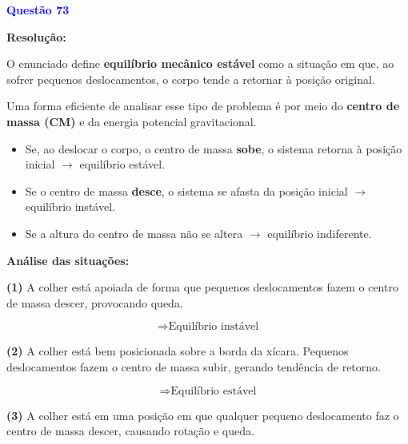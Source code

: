\documentclass[a4paper,12pt]{article}
\begin{document}
\begin{flushleft}

\textbf{\textcolor{blue}{\Large Quest\~ao 73}}\\

\vspace{0.3cm}

\textbf{Resolu\c{c}\~ao:}

\vspace{0.3cm}

O enunciado define \textbf{equilíbrio mecânico estável} como a situação em que, ao sofrer pequenos deslocamentos, o corpo tende a retornar à posição original.

\vspace{0.3cm}

Uma forma eficiente de analisar esse tipo de problema é por meio do \textbf{centro de massa (CM)} e da energia potencial gravitacional.

\begin{itemize}
\item Se, ao deslocar o corpo, o centro de massa \textbf{sobe}, o sistema retorna à posição inicial $\rightarrow$ equilíbrio estável.
\item Se o centro de massa \textbf{desce}, o sistema se afasta da posição inicial $\rightarrow$ equilíbrio instável.
\item Se a altura do centro de massa não se altera $\rightarrow$ equilíbrio indiferente.
\end{itemize}

\vspace{0.3cm}

\textbf{Análise das situações:}

\vspace{0.2cm}

\textbf{(1)} A colher está apoiada de forma que pequenos deslocamentos fazem o centro de massa descer, provocando queda.

\[
\Rightarrow \text{Equilíbrio instável}
\]

\vspace{0.2cm}

\textbf{(2)} A colher está bem posicionada sobre a borda da xícara. Pequenos deslocamentos fazem o centro de massa subir, gerando tendência de retorno.

\[
\Rightarrow \text{Equilíbrio estável}
\]

\vspace{0.2cm}

\textbf{(3)} A colher está em uma posição em que qualquer pequeno deslocamento faz o centro de massa descer, causando rotação e queda.


\end{flushleft}
\end{document}
